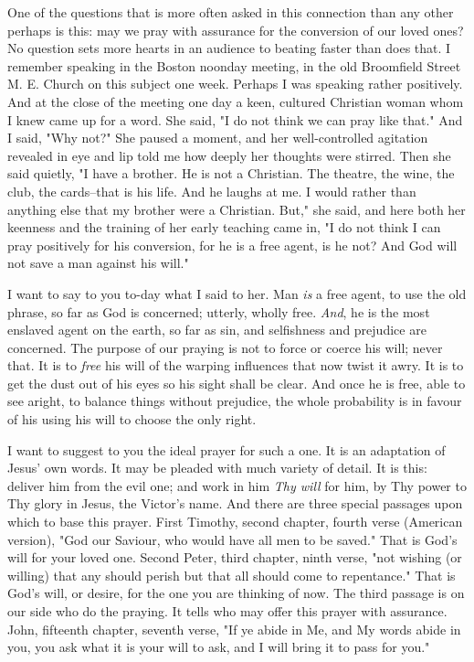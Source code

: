 One of the questions that is more often asked in this connection than any
other perhaps is this: may we pray with assurance for the conversion of
our loved ones? No question sets more hearts in an audience to beating
faster than does that. I remember speaking in the Boston noonday meeting,
in the old Broomfield Street M. E. Church on this subject one week.
Perhaps I was speaking rather positively. And at the close of the meeting
one day a keen, cultured Christian woman whom I knew came up for a word.
She said, "I do not think we can pray like that." And I said, "Why not?"
She paused a moment, and her well-controlled agitation revealed in eye and
lip told me how deeply her thoughts were stirred. Then she said quietly,
"I have a brother. He is not a Christian. The theatre, the wine, the club,
the cards--that is his life. And he laughs at me. I would rather than
anything else that my brother were a Christian. But," she said, and here
both her keenness and the training of her early teaching came in, "I do
not think I can pray positively for his conversion, for he is a free
agent, is he not? And God will not save a man against his will."

I want to say to you to-day what I said to her. Man \textit{is} a free agent, to
use the old phrase, so far as God is concerned; utterly, wholly free.
\textit{And}, he is the most enslaved agent on the earth, so far as sin, and
selfishness and prejudice are concerned. The purpose of our praying is not
to force or coerce his will; never that. It is to \textit{free} his will of the
warping influences that now twist it awry. It is to get the dust out of
his eyes so his sight shall be clear. And once he is free, able to see
aright, to balance things without prejudice, the whole probability is in
favour of his using his will to choose the only right.

I want to suggest to you the ideal prayer for such a one. It is an
adaptation of Jesus' own words. It may be pleaded with much variety of
detail. It is this: deliver him from the evil one; and work in him \textit{Thy
will} for him, by Thy power to Thy glory in Jesus, the Victor's name. And
there are three special passages upon which to base this prayer. First
Timothy, second chapter, fourth verse (American version), "God our
Saviour, who would have all men to be saved." That is God's will for your
loved one. Second Peter, third chapter, ninth verse, "not wishing (or
willing) that any should perish but that all should come to repentance."
That is God's will, or desire, for the one you are thinking of now. The
third passage is on our side who do the praying. It tells who may offer
this prayer with assurance. John, fifteenth chapter, seventh verse, "If ye
abide in Me, and My words abide in you, you ask what it is your will to
ask, and I will bring it to pass for you."

